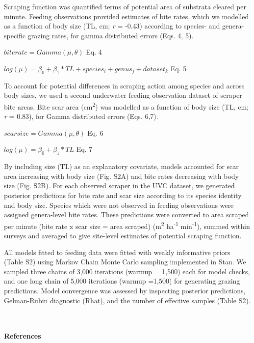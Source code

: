 \documentclass[12pt,]{article}
\let\oldparagraph\paragraph
\renewcommand{\paragraph}[1]{\oldparagraph{#1}\mbox{}}
\begin{document}
Scraping function was quantified terms of potential area of substrata
cleared per minute. Feeding observations provided estimates of bite
rates, which we modelled as a function of body size (TL, cm; \emph{r} =
-0.43) according to species- and genera-specific grazing rates, for
gamma distributed errors (Eqs. 4, 5).

\(biterate = Gamma(\mu, \theta)\) \hfill Eq. 4

\(log(\mu) = \beta_0 + \beta_1*TL + species_i + genus_j + dataset_k\)
\hfill Eq. 5

To account for potential differences in scraping action among species
and across body sizes, we used a second underwater feeding observation
dataset of scraper bite areas. Bite scar area (cm\textsuperscript{2})
was modelled as a function of body size (TL, cm; \emph{r} = 0.83), for
Gamma distributed errors (Eqs. 6,7).

\(scarsize = Gamma(\mu, \theta)\) \hfill Eq. 6

\(log(\mu) = \beta_0 + \beta_1*TL\) \hfill Eq. 7

By including size (TL) as an explanatory covariate, models accounted for
scar area increasing with body size (Fig. S2A) and bite rates decreasing
with body size (Fig. S2B). For each observed scraper in the UVC dataset,
we generated posterior predictions for bite rate and scar size according
to its species identity and body size. Species which were not observed
in feeding observations were assigned genera-level bite rates. These
predictions were converted to area scraped per minute (bite rate x scar
size = area scraped) (m\textsuperscript{2} ha\textsuperscript{-1}
min\textsuperscript{-1}), summed within surveys and averaged to give
site-level estimates of potential scraping function.

All models fitted to feeding data were fitted with weakly informative
priors (Table S2) using Markov Chain Monte Carlo sampling implemented in
Stan. We sampled three chains of 3,000 iterations (warmup = 1,500) each
for model checks, and one long chain of 5,000 iterations (warmup =1,500)
for generating grazing predictions. Model convergence was assessed by
inspecting posterior predictions, Gelman-Rubin diagnostic (Rhat), and
the number of effective samples (Table S2).

~

\hypertarget{references}{%
\paragraph{References}\label{references}}
\end{document}
